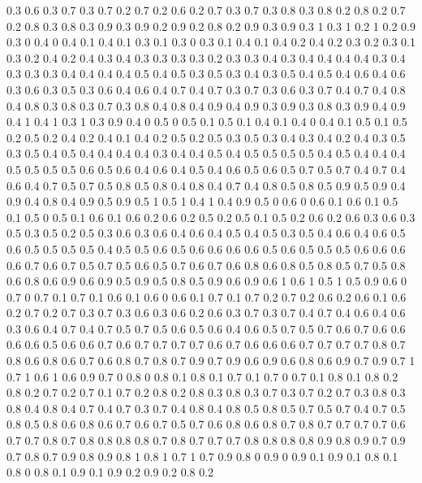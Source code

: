 0.3 0.6
0.3 0.7
0.3 0.7
0.2 0.7
0.2 0.6
0.2 0.7
0.3 0.7
0.3 0.8
0.3 0.8
0.2 0.8
0.2 0.7
0.2 0.8
0.3 0.8
0.3 0.9
0.3 0.9
0.2 0.9
0.2 0.8
0.2 0.9
0.3 0.9
0.3 1
0.3 1
0.2 1
0.2 0.9
0.3 0
0.4 0
0.4 0.1
0.4 0.1
0.3 0.1
0.3 0
0.3 0.1
0.4 0.1
0.4 0.2
0.4 0.2
0.3 0.2
0.3 0.1
0.3 0.2
0.4 0.2
0.4 0.3
0.4 0.3
0.3 0.3
0.3 0.2
0.3 0.3
0.4 0.3
0.4 0.4
0.4 0.4
0.3 0.4
0.3 0.3
0.3 0.4
0.4 0.4
0.4 0.5
0.4 0.5
0.3 0.5
0.3 0.4
0.3 0.5
0.4 0.5
0.4 0.6
0.4 0.6
0.3 0.6
0.3 0.5
0.3 0.6
0.4 0.6
0.4 0.7
0.4 0.7
0.3 0.7
0.3 0.6
0.3 0.7
0.4 0.7
0.4 0.8
0.4 0.8
0.3 0.8
0.3 0.7
0.3 0.8
0.4 0.8
0.4 0.9
0.4 0.9
0.3 0.9
0.3 0.8
0.3 0.9
0.4 0.9
0.4 1
0.4 1
0.3 1
0.3 0.9
0.4 0
0.5 0
0.5 0.1
0.5 0.1
0.4 0.1
0.4 0
0.4 0.1
0.5 0.1
0.5 0.2
0.5 0.2
0.4 0.2
0.4 0.1
0.4 0.2
0.5 0.2
0.5 0.3
0.5 0.3
0.4 0.3
0.4 0.2
0.4 0.3
0.5 0.3
0.5 0.4
0.5 0.4
0.4 0.4
0.4 0.3
0.4 0.4
0.5 0.4
0.5 0.5
0.5 0.5
0.4 0.5
0.4 0.4
0.4 0.5
0.5 0.5
0.5 0.6
0.5 0.6
0.4 0.6
0.4 0.5
0.4 0.6
0.5 0.6
0.5 0.7
0.5 0.7
0.4 0.7
0.4 0.6
0.4 0.7
0.5 0.7
0.5 0.8
0.5 0.8
0.4 0.8
0.4 0.7
0.4 0.8
0.5 0.8
0.5 0.9
0.5 0.9
0.4 0.9
0.4 0.8
0.4 0.9
0.5 0.9
0.5 1
0.5 1
0.4 1
0.4 0.9
0.5 0
0.6 0
0.6 0.1
0.6 0.1
0.5 0.1
0.5 0
0.5 0.1
0.6 0.1
0.6 0.2
0.6 0.2
0.5 0.2
0.5 0.1
0.5 0.2
0.6 0.2
0.6 0.3
0.6 0.3
0.5 0.3
0.5 0.2
0.5 0.3
0.6 0.3
0.6 0.4
0.6 0.4
0.5 0.4
0.5 0.3
0.5 0.4
0.6 0.4
0.6 0.5
0.6 0.5
0.5 0.5
0.5 0.4
0.5 0.5
0.6 0.5
0.6 0.6
0.6 0.6
0.5 0.6
0.5 0.5
0.5 0.6
0.6 0.6
0.6 0.7
0.6 0.7
0.5 0.7
0.5 0.6
0.5 0.7
0.6 0.7
0.6 0.8
0.6 0.8
0.5 0.8
0.5 0.7
0.5 0.8
0.6 0.8
0.6 0.9
0.6 0.9
0.5 0.9
0.5 0.8
0.5 0.9
0.6 0.9
0.6 1
0.6 1
0.5 1
0.5 0.9
0.6 0
0.7 0
0.7 0.1
0.7 0.1
0.6 0.1
0.6 0
0.6 0.1
0.7 0.1
0.7 0.2
0.7 0.2
0.6 0.2
0.6 0.1
0.6 0.2
0.7 0.2
0.7 0.3
0.7 0.3
0.6 0.3
0.6 0.2
0.6 0.3
0.7 0.3
0.7 0.4
0.7 0.4
0.6 0.4
0.6 0.3
0.6 0.4
0.7 0.4
0.7 0.5
0.7 0.5
0.6 0.5
0.6 0.4
0.6 0.5
0.7 0.5
0.7 0.6
0.7 0.6
0.6 0.6
0.6 0.5
0.6 0.6
0.7 0.6
0.7 0.7
0.7 0.7
0.6 0.7
0.6 0.6
0.6 0.7
0.7 0.7
0.7 0.8
0.7 0.8
0.6 0.8
0.6 0.7
0.6 0.8
0.7 0.8
0.7 0.9
0.7 0.9
0.6 0.9
0.6 0.8
0.6 0.9
0.7 0.9
0.7 1
0.7 1
0.6 1
0.6 0.9
0.7 0
0.8 0
0.8 0.1
0.8 0.1
0.7 0.1
0.7 0
0.7 0.1
0.8 0.1
0.8 0.2
0.8 0.2
0.7 0.2
0.7 0.1
0.7 0.2
0.8 0.2
0.8 0.3
0.8 0.3
0.7 0.3
0.7 0.2
0.7 0.3
0.8 0.3
0.8 0.4
0.8 0.4
0.7 0.4
0.7 0.3
0.7 0.4
0.8 0.4
0.8 0.5
0.8 0.5
0.7 0.5
0.7 0.4
0.7 0.5
0.8 0.5
0.8 0.6
0.8 0.6
0.7 0.6
0.7 0.5
0.7 0.6
0.8 0.6
0.8 0.7
0.8 0.7
0.7 0.7
0.7 0.6
0.7 0.7
0.8 0.7
0.8 0.8
0.8 0.8
0.7 0.8
0.7 0.7
0.7 0.8
0.8 0.8
0.8 0.9
0.8 0.9
0.7 0.9
0.7 0.8
0.7 0.9
0.8 0.9
0.8 1
0.8 1
0.7 1
0.7 0.9
0.8 0
0.9 0
0.9 0.1
0.9 0.1
0.8 0.1
0.8 0
0.8 0.1
0.9 0.1
0.9 0.2
0.9 0.2
0.8 0.2
